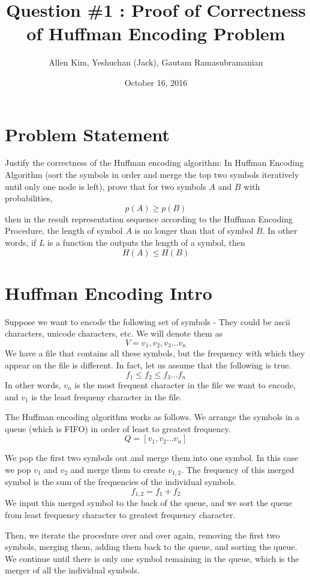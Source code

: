 \documentclass{article}
\title{Question \#1 : Proof of Correctness of Huffman Encoding Problem}
\author{Allen Kim, Yeshuchan (Jack), Gautam Ramasubramanian}
\date{October 16, 2016}
\begin{document}
\maketitle

\section*{Problem Statement}

Justify the correctness of the Huffman encoding algorithm: 
In Huffman Encoding Algorithm (sort the symbols in order and merge the top two symbols iteratively until only one node is left), 
prove that for two symbols $A$ and $B$ with probabilities,
$$
	p(A) \geq p(B)
$$ 
then in the result representation sequence according to the Huffman Encoding Procedure,
the length of symbol $A$ is no longer than that of symbol $B$. In other words, if $L$ is a function the outputs the length of a symbol, then
$$
	H(A) \leq H(B)
$$

\section*{Huffman Encoding Intro}

Suppose we want to encode the following set of symbols - They could be ascii characters, unicode characters, etc. We will denote them as
$$
V = {v_1, v_2, v_3 \ldots v_n}
$$
We have a file that contains all these symbols, but the frequency with which they appear on the file is different. In fact, let us assume that the following is true.
$$
f_1 \leq f_2 \leq f_3 \ldots f_n
$$ 
In other words, $v_n$ is the most frequent character in the file we want to encode, and $v_1$ is the least frequeny character in the file.

The Huffman encoding algorithm works as follows. We arrange the symbols in a queue (which is FIFO) in order of least to greatest frequency.
$$
Q = \left[ v_1, v_2 \ldots v_n \right]
$$ 

We pop the first two symbols out and merge them into one symbol. In this case we pop $v_1$ and $v_2$ and merge them to create $v_{1,2}$. The frequency of this merged symbol is the sum of the frequencies of the individual symbols.
$$
f_{1,2} = f_1 + f_2
$$
We input this merged symbol to the back of the queue, and we sort the queue from least frequency character to greatest frequency character.

Then, we iterate the procedure over and over again, removing the first two symbols, merging them, adding them back to the queue, and sorting the queue. We continue until there is only one symbol remaining in the queue, which is the merger of all the individual symbols.
\end{document}
